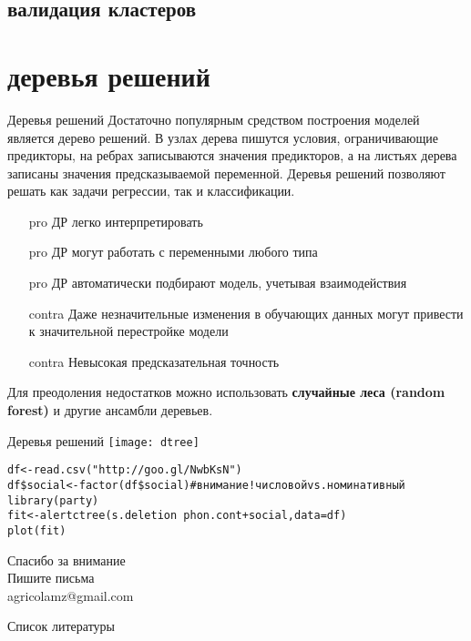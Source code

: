 \subsection{валидация кластеров}
\section{деревья решений}
\begin{frame}{Деревья решений}
Достаточно популярным средством построения моделей является дерево решений. В узлах дерева пишутся условия, ограничивающие предикторы, на ребрах записываются значения предикторов, а на листьях дерева записаны значения предсказываемой переменной. Деревья решений позволяют решать как задачи регрессии, так и классификации.
\vspace{-3mm}
\begin{multicols}{2}
\begin{itemize}
\item[pro]  ДР легко интерпретировать
\item[pro] ДР могут работать с переменными любого типа
\item[pro] ДР автоматически подбирают модель, учетывая взаимодействия
\columnbreak
\item[contra] Даже незначительные изменения в обучающих данных могут привести к значительной перестройке модели
\item[contra] Невысокая предсказательная точность
\end{itemize}
\end{multicols}
Для преодоления недостатков можно использовать \textbf{случайные леса (random forest)} и другие ансамбли деревьев.
\end{frame}
\begin{frame}{Деревья решений}
\texttt{[image: dtree]}\\
\scriptsize
\begin{alltt}
df <- read.csv("http://goo.gl/NwbKsN") \\
df\$social <- \alert{factor(df\$social) \hfill \# внимание! числовой vs. номинативный}\medskip\\
\alert{library(party)} \\
fit <- alert{ctree(}s.deletion~phon.cont+social, data=df\alert{)}\\
plot(fit)
\end{alltt}
\normalsize
\end{frame}
\begin{frame}
{\huge Спасибо за внимание\bigskip\\
\normalsize Пишите письма\\
agricolamz@gmail.com
\vspace{-130pt}}
\end{frame}
\begin{frame}{Список литературы}
\footnotesize


\end{frame}
